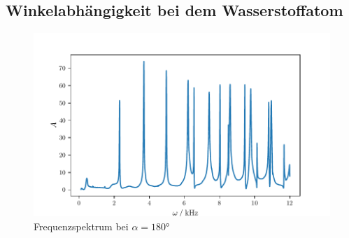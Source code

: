 \subsection{Winkelabhängigkeit bei dem Wasserstoffatom}
\begin{figure}
    \centering
    \includegraphics{build/hangle.pdf}
    \caption{Frequenzspektrum bei $\alpha = \ang{180}$}
    \label{pic:hangle}
\end{figure}
